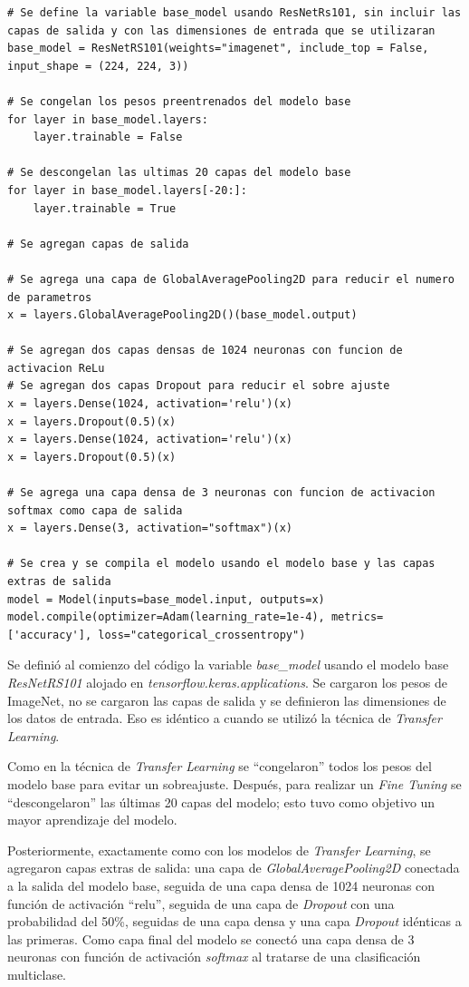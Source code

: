 \begin{lstlisting}[caption={Código creación CNN con \textit{Fine Tuning} con \textit{ResNetRS101}}]
# Se define la variable base_model usando ResNetRs101, sin incluir las capas de salida y con las dimensiones de entrada que se utilizaran
base_model = ResNetRS101(weights="imagenet", include_top = False, input_shape = (224, 224, 3))

# Se congelan los pesos preentrenados del modelo base
for layer in base_model.layers:
    layer.trainable = False

# Se descongelan las ultimas 20 capas del modelo base
for layer in base_model.layers[-20:]:
    layer.trainable = True

# Se agregan capas de salida

# Se agrega una capa de GlobalAveragePooling2D para reducir el numero de parametros
x = layers.GlobalAveragePooling2D()(base_model.output)

# Se agregan dos capas densas de 1024 neuronas con funcion de activacion ReLu
# Se agregan dos capas Dropout para reducir el sobre ajuste
x = layers.Dense(1024, activation='relu')(x)
x = layers.Dropout(0.5)(x)
x = layers.Dense(1024, activation='relu')(x)
x = layers.Dropout(0.5)(x)

# Se agrega una capa densa de 3 neuronas con funcion de activacion softmax como capa de salida
x = layers.Dense(3, activation="softmax")(x)

# Se crea y se compila el modelo usando el modelo base y las capas extras de salida
model = Model(inputs=base_model.input, outputs=x)
model.compile(optimizer=Adam(learning_rate=1e-4), metrics=['accuracy'], loss="categorical_crossentropy")
\end{lstlisting}

Se definió al comienzo del código la variable \textit{base\_model} usando el modelo base \textit{ResNetRS101} alojado en \textit{tensorflow.keras.applications}. Se cargaron los pesos de ImageNet, no se cargaron las capas de salida y se definieron las dimensiones de los datos de entrada. Eso es idéntico a cuando se utilizó la técnica de \textit{Transfer Learning}.

Como en la técnica de \textit{Transfer Learning} se ``congelaron'' todos los pesos del modelo base para evitar un sobreajuste. Después, para realizar un \textit{Fine Tuning} se ``descongelaron'' las últimas 20 capas del modelo; esto tuvo como objetivo un mayor aprendizaje del modelo.

Posteriormente, exactamente como con los modelos de \textit{Transfer Learning}, se agregaron capas extras de salida: una capa de \textit{GlobalAveragePooling2D} conectada a la salida del modelo base, seguida de una capa densa de 1024 neuronas con función de activación ``relu'', seguida de una capa de \textit{Dropout} con una probabilidad del 50\%, seguidas de una capa densa y una capa \textit{Dropout} idénticas a las primeras. Como capa final del modelo se conectó una capa densa de 3 neuronas con función de activación \textit{softmax} al tratarse de una clasificación multiclase.

